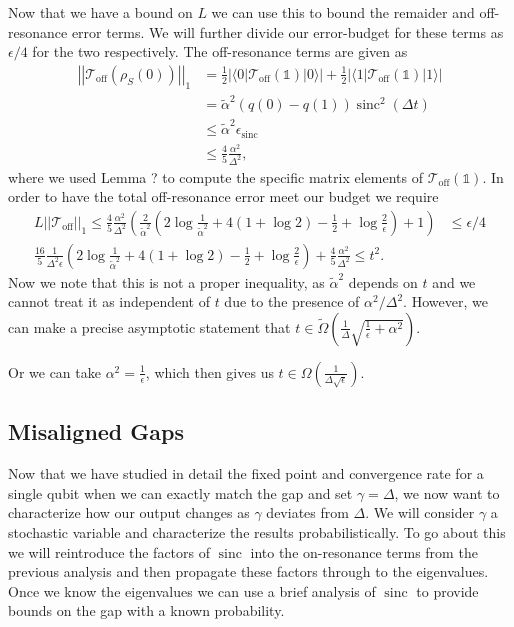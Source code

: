 \documentclass{article}
\newcommand{\off}{\text{off}}
\newcommand{\ket}[1]{|#1\rangle}
\newcommand{\bra}[1]{\langle #1|}
\newcommand{\norm}[1]{\left| \left| #1 \right| \right|}
\newcommand{\identity}{\mathds{1}}
\DeclareMathOperator{\sinc}{sinc}
\begin{document}
Now that we have a bound on $L$ we can use this to bound the remaider and off-resonance error terms. We will further divide our error-budget for these terms as $\epsilon / 4$ for the two respectively. The off-resonance terms are given as 
\begin{align}
    \norm{\mathcal{T}_{\off}(\rho_S(0))}_1 &=  \frac{1}{2} \left| \bra{0} \mathcal{T}_{\off}(\identity) \ket{0} \right| + \frac{1}{2} \left| \bra{1} \mathcal{T}_{\off}(\identity) \ket{1} \right| \\
    &= \widetilde{\alpha}^2 (q(0) - q(1)) \sinc^2( \Delta t ) \\
    &\le \widetilde{\alpha}^2 \epsilon_{\sinc} \\
    &\le \frac{4}{5} \frac{\alpha^2}{\Delta^2},
\end{align}
where we used Lemma ? to compute the specific matrix elements of $\mathcal{T}_{\off}(\identity)$. In order to have the total off-resonance error meet our budget we require
\begin{align}
    L \norm{\mathcal{T}_{\off}}_1 \le \frac{4}{5} \frac{\alpha^2}{\Delta^2} \left(\frac{2}{\widetilde{\alpha}^2}\left(  2 \log \frac{1}{\widetilde{\alpha}^2} + 4( 1 + \log 2) - \frac{1}{2} + \log \frac{2}{\epsilon} \right) + 1 \right) &\le \epsilon / 4 \\
    \frac{16}{5} \frac{1}{\Delta^2 \epsilon} \left(  2 \log \frac{1}{\widetilde{\alpha}^2} + 4( 1 + \log 2) - \frac{1}{2} + \log \frac{2}{\epsilon} \right) + \frac{4}{5} \frac{\alpha^2}{\Delta^2} \le t^2.
\end{align}
Now we note that this is not a proper inequality, as $\widetilde{\alpha}^2$ depends on $t$ and we cannot treat it as independent of $t$ due to the presence of $\alpha^2 / \Delta^2$. However, we can make a precise asymptotic statement that $t \in \widetilde{\Omega} \left( \frac{1}{\Delta} \sqrt{ \frac{1}{\epsilon} + \alpha^2} \right)$.

Or we can take $\alpha^2 = \frac{1}{\epsilon}$, which then gives us $t \in \Omega \left(\frac{1}{\Delta \sqrt{\epsilon}} \right)$. 

\subsection{Misaligned Gaps}
Now that we have studied in detail the fixed point and convergence rate for a single qubit when we can exactly match the gap and set $\gamma = \Delta$, we now want to characterize how our output changes as $\gamma$ deviates from $\Delta$. We will consider $\gamma$ a stochastic variable and characterize the results probabilistically. To go about this we will reintroduce the factors of $\sinc$ into the on-resonance terms from the previous analysis and then propagate these factors through to the eigenvalues. Once we know the eigenvalues we can use a brief analysis of $\sinc$ to provide bounds on the gap with a known probability.
\end{document}
